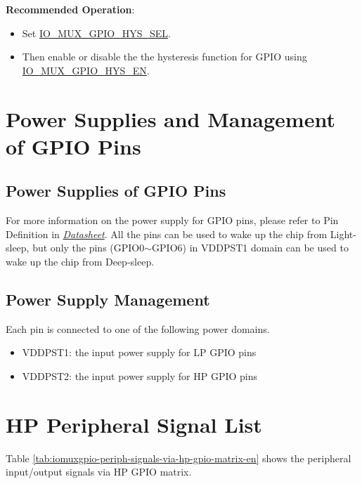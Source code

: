 \documentclass[main\_\_EN.tex]{subfiles}
\begin{document}
\textbf{Recommended Operation}:\\
\begin{itemize}
    \item Set \hyperref[fielddesc:IOMUXGPIONHYSSEL]{IO\_MUX\_GPIO\_HYS\_SEL}.
    \item Then enable or disable the the hysteresis function for GPIO using \hyperref[fielddesc:IOMUXGPIONHYSEN]{IO\_MUX\_GPIO\_HYS\_EN}.
\end{itemize}


\section{Power Supplies and Management of GPIO Pins}\label{I/O Pad Power Supplies}

\subsection{Power Supplies of GPIO Pins}
For more information on the power supply for GPIO pins, please refer to Pin Definition in {\textit{\href{https://www.espressif.com/sites/default/files/documentation/esp32-c5_datasheet_en.pdf}{\chipname{} Datasheet}}}. All the pins can be used to wake up the chip from Light-sleep, but only the pins (GPIO0$\sim$GPIO6) in VDDPST1 domain can be used to wake up the chip from Deep-sleep.

\subsection{Power Supply Management}

Each \chipname{} pin is connected to one of the following power domains.

\begin{itemize}
    \item VDDPST1: the input power supply for LP GPIO pins
    \item VDDPST2: the input power supply for HP GPIO pins
\end{itemize}

\section{HP Peripheral Signal List}
\label{sec:hp_peripheral_signals}

Table \ref{tab:iomuxgpio-periph-signals-via-hp-gpio-matrix-en} shows the peripheral input/output signals via HP GPIO matrix.
\end{document}
